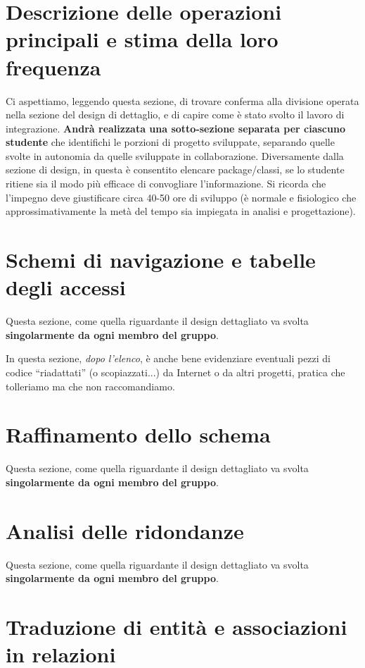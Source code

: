 \documentclass[a4paper,12pt]{report}
\begin{document}
\section{Descrizione delle operazioni principali e stima della loro frequenza}

Ci aspettiamo, leggendo questa sezione, di trovare conferma alla divisione operata nella sezione del design di dettaglio, e di capire come è stato svolto il lavoro di integrazione.
%
\textbf{Andrà realizzata una sotto-sezione separata per ciascuno studente} che identifichi le porzioni di progetto sviluppate, separando quelle svolte in autonomia da quelle sviluppate in collaborazione.
%
Diversamente dalla sezione di design, in questa è consentito elencare package/classi, se lo studente ritiene sia il modo più efficace di convogliare l'informazione.
%
Si ricorda che l'impegno deve giustificare circa 40-50 ore di sviluppo (è normale e fisiologico che approssimativamente la metà del tempo sia impiegata in analisi e progettazione).

\section{Schemi di navigazione e tabelle degli accessi}

Questa sezione, come quella riguardante il design dettagliato va svolta \textbf{singolarmente da ogni membro del gruppo}.

%
In questa sezione, \textit{dopo l'elenco}, è anche bene evidenziare eventuali pezzi di codice ``riadattati'' (o scopiazzati...) da Internet o da altri progetti, pratica che tolleriamo ma che non raccomandiamo.

\section{Raffinamento dello schema}

Questa sezione, come quella riguardante il design dettagliato va svolta \textbf{singolarmente da ogni membro del gruppo}.


\section{Analisi delle ridondanze}

Questa sezione, come quella riguardante il design dettagliato va svolta \textbf{singolarmente da ogni membro del gruppo}.


\section{Traduzione di entità e associazioni in relazioni}
\end{document}
